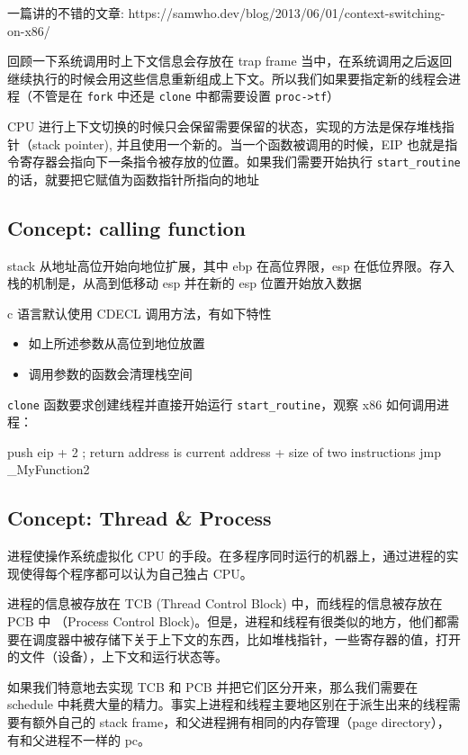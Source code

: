 一篇讲的不错的文章: 
https://samwho.dev/blog/2013/06/01/context-switching-on-x86/

回顾一下系统调用时上下文信息会存放在 trap frame 当中，在系统调用之后返回继续执行的时候会用这些信息重新组成上下文。所以我们如果要指定新的线程会进程（不管是在 \texttt{fork} 中还是 \texttt{clone} 中都需要设置 \texttt{proc->tf}）

CPU 进行上下文切换的时候只会保留需要保留的状态，实现的方法是保存堆栈指针（stack pointer), 并且使用一个新的。当一个函数被调用的时候，EIP 也就是指令寄存器会指向下一条指令被存放的位置。如果我们需要开始执行 \texttt{start\_routine} 的话，就要把它赋值为函数指针所指向的地址

\subsection{Concept: calling function}

stack 从地址高位开始向地位扩展，其中 ebp 在高位界限，esp 在低位界限。存入栈的机制是，从高到低移动 esp 并在新的 esp 位置开始放入数据

c 语言默认使用 CDECL 调用方法，有如下特性

\begin{itemize}
    \item 如上所述参数从高位到地位放置
    \item 调用参数的函数会清理栈空间
\end{itemize}

\texttt{clone} 函数要求创建线程并直接开始运行 \texttt{start\_routine}，观察 x86 如何调用进程：

\begin{asmcode}
    push eip + 2 ; return address is current address + size of two instructions
    jmp _MyFunction2
\end{asmcode}


\subsection{Concept: Thread \&  Process}

进程使操作系统虚拟化 CPU 的手段。在多程序同时运行的机器上，通过进程的实现使得每个程序都可以认为自己独占 CPU。

进程的信息被存放在 TCB (Thread Control Block) 中，而线程的信息被存放在 PCB 中 （Process Control Block)。但是，进程和线程有很类似的地方，他们都需要在调度器中被存储下关于上下文的东西，比如堆栈指针，一些寄存器的值，打开的文件（设备），上下文和运行状态等。

如果我们特意地去实现 TCB 和 PCB 并把它们区分开来，那么我们需要在 schedule 中耗费大量的精力。事实上进程和线程主要地区别在于派生出来的线程需要有额外自己的 stack frame，和父进程拥有相同的内存管理（page directory），有和父进程不一样的 pc。

